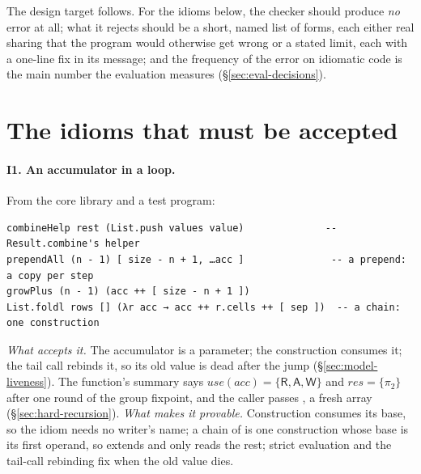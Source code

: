 The design target follows. For the idioms below, the checker should produce \emph{no} error at all;
what it rejects should be a short, named list of forms, each either real sharing that the program would
otherwise get wrong or a stated limit, each with a one-line fix in its message; and the frequency of the
error on idiomatic code is the main number the evaluation measures (\S\ref{sec:eval-decisions}).

\section{The idioms that must be accepted}
\label{sec:idioms-list}

\paragraph{I1. An accumulator in a loop.} From the core library and a test program:
\begin{Verbatim}
combineHelp rest (List.push values value)              -- Result.combine's helper
prependAll (n - 1) [ size - n + 1, …acc ]               -- a prepend: a copy per step
growPlus (n - 1) (acc ++ [ size - n + 1 ])
List.foldl rows [] (λr acc → acc ++ r.cells ++ [ sep ])  -- a chain: one construction
\end{Verbatim}
\emph{What accepts it.} The accumulator is a parameter; the construction consumes it; the tail call
rebinds it, so its old value is dead after the jump (\S\ref{sec:model-liveness}). The function's summary
says $\mathit{use}(\mathit{acc}) = \{\mathsf{R}, \mathsf{A}, \mathsf{W}\}$ and $\mathit{res} = \{\pi_2\}$
after one round of the group fixpoint, and the caller passes \code{[]}, a fresh array
(\S\ref{sec:hard-recursion}). \emph{What makes it provable.} Construction consumes its base, so the
idiom needs no writer's name; a chain of \code{++} is one construction whose base is its first operand, so
 extends  and only reads the rest; strict evaluation and the
tail-call rebinding fix when the old value dies.

